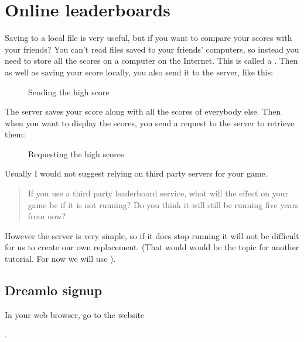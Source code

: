\documentclass[a4paper,12pt,english]{sphinxmanual}
\begin{document}
\chapter{Online leaderboards}
\label{\detokenize{tutorial:online-leaderboards}}
\sphinxAtStartPar
Saving to a local file is very useful, but if you want to compare your
scores with your friends? You can’t read files saved to your friends’
computers, so instead you need to store all the scores on a computer on
the Internet. This is called a . Then as well as saving your
score locally, you also send it to the server, like this:

\begin{figure}[htbp]
\centering
\capstart

\noindent{}
\caption{Sending the high score}\label{\detokenize{tutorial:id7}}\end{figure}

\sphinxAtStartPar
The server saves your score along with all the scores of everybody else.
Then when you want to display the scores, you send a request to the
server to retrieve them:

\begin{figure}[htbp]
\centering
\capstart

\noindent{}
\caption{Requesting the high scores}\label{\detokenize{tutorial:id8}}\end{figure}

\sphinxAtStartPar
Usually I would not suggest relying on third party servers for your
game.
\begin{quote}

\sphinxAtStartPar
If you use a third party leaderboard service, what will the effect on
your game be if it is not running? Do you think it will still be
running five years from now?
\end{quote}

\sphinxAtStartPar
However the  server is very simple, so if it does stop running
it will not be difficult for us to create our own replacement. (That
would would be the topic for another tutorial. For now we will use
).


\section{Dreamlo sign\sphinxhyphen{}up}
\label{\detokenize{tutorial:dreamlo-sign-up}}
\sphinxAtStartPar
In your web browser, go to the website
%
\begin{footnote}[6]\sphinxAtStartFootnote
{}
%
\end{footnote}.
\end{document}
